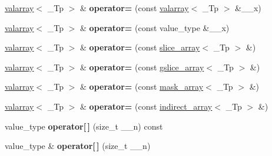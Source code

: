 \begin{DoxyCompactItemize}
\item 
\mbox{\label{classvalarray_aaac7c01bf5c17cc0c285a54d67ae989a}} 
\hyperlink{classvalarray}{valarray}$<$ \+\_\+\+Tp $>$ \& {\bfseries operator=} (const \hyperlink{classvalarray}{valarray}$<$ \+\_\+\+Tp $>$ \&\+\_\+\+\_\+x)
\item 
\mbox{\label{classvalarray_a63598dd43e003786c63920dad62a0c0f}} 
\hyperlink{classvalarray}{valarray}$<$ \+\_\+\+Tp $>$ \& {\bfseries operator=} (const value\+\_\+type \&\+\_\+\+\_\+x)
\item 
\mbox{\label{classvalarray_a373a70c98cbb9b4dd1d08b12f8ec256c}} 
\hyperlink{classvalarray}{valarray}$<$ \+\_\+\+Tp $>$ \& {\bfseries operator=} (const \hyperlink{classslice__array}{slice\+\_\+array}$<$ \+\_\+\+Tp $>$ \&)
\item 
\mbox{\label{classvalarray_a08088ef6dc853bdb1191764c16212003}} 
\hyperlink{classvalarray}{valarray}$<$ \+\_\+\+Tp $>$ \& {\bfseries operator=} (const \hyperlink{classgslice__array}{gslice\+\_\+array}$<$ \+\_\+\+Tp $>$ \&)
\item 
\mbox{\label{classvalarray_a06c1d4bb8abf48de0ae4ea4068877ffb}} 
\hyperlink{classvalarray}{valarray}$<$ \+\_\+\+Tp $>$ \& {\bfseries operator=} (const \hyperlink{classmask__array}{mask\+\_\+array}$<$ \+\_\+\+Tp $>$ \&)
\item 
\mbox{\label{classvalarray_aba6d9699fcfafeb8b6727590207a9a8c}} 
\hyperlink{classvalarray}{valarray}$<$ \+\_\+\+Tp $>$ \& {\bfseries operator=} (const \hyperlink{classindirect__array}{indirect\+\_\+array}$<$ \+\_\+\+Tp $>$ \&)
\item 
\mbox{\label{classvalarray_adc78b8d4535ce39387578aca9cd90b83}} 
value\+\_\+type {\bfseries operator\mbox{[}$\,$\mbox{]}} (size\+\_\+t \+\_\+\+\_\+n) const
\item 
\mbox{\label{classvalarray_a326c7022d35558a05e7676db7fa761d1}} 
value\+\_\+type \& {\bfseries operator\mbox{[}$\,$\mbox{]}} (size\+\_\+t \+\_\+\+\_\+n)
\item 
\mbox{\label{classvalarray_ae41abf831708a571acf4de2b69e8cd30}} 

\end{DoxyCompactItemize}
